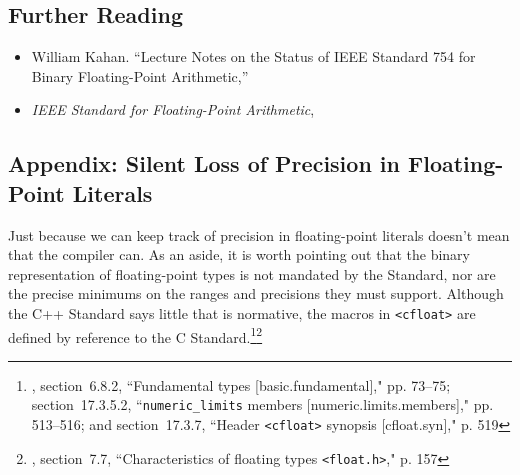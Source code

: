 \subsection[Further Reading]{Further Reading}\label{further-reading}

\begin{itemize}
\item{William Kahan. ``Lecture Notes on the Status of
IEEE Standard 754 for Binary Floating-Point Arithmetic,'' \cite{kahan97}}
\item{{\textit{IEEE Standard for Floating-Point Arithmetic}}, \cite{ieee19}}
\end{itemize}

\subsection[Appendix: Silent Loss of Precision in Floating-Point Literals]{Appendix: Silent Loss of Precision in Floating-Point Literals}\label{appendix:-silent-loss-of-precision-in-floating-point-literals}

Just because we can keep track of precision in floating-point literals
doesn't mean that the compiler can. As an aside, it is worth
pointing out that the binary representation of floating-point types is
not mandated by the Standard, nor are the precise minimums on the ranges
and precisions they must support. Although the C++ Standard says little
that is normative, the macros in \lstinline!<cfloat>! are defined by
reference to the C Standard.\footnote{\cite{iso20b}, section~6.8.2, ``Fundamental types [basic.fundamental]," pp. 73--75; section~17.3.5.2, ``\texttt{numeric\_limits} members [numeric.limits.members]," pp. 513--516; and section~17.3.7, ``Header \texttt{<cfloat>} synopsis [cfloat.syn]," p. 519}\footnote{\cite{iso18b}, section~7.7,
``Characteristics of floating types \texttt{<float.h>}," p. 157}

